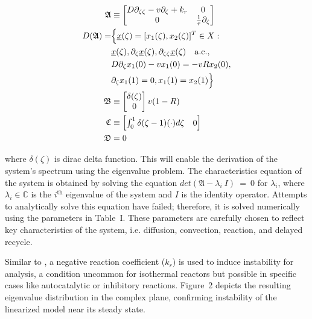 \begin{equation} \label{eq:operator_A}
    \begin{aligned}
        \mathfrak{A} &\equiv
        \begin{bmatrix}
            D \partial_{\zeta \zeta} - v \partial_\zeta + k_r & 0 \\
            0 & \frac{1}{\tau} \partial_\zeta
        \end{bmatrix} \\
        D(\mathfrak{A}) =& \Bigl\{ \underline{x}(\zeta) = [x_1(\zeta), x_2(\zeta)]^T \in X:\\
        &\underline{x}(\zeta), \partial_\zeta \underline{x}(\zeta), \partial_{\zeta \zeta} \underline{x}(\zeta) \quad \mathrm{a.c.},\\
        &D \partial_\zeta x_1(0) - v x_1(0) = -v R x_2(0),\\
        &\partial_\zeta x_1(1) = 0,
        x_1(1) = x_2(1) \Bigr\}\\
        \mathfrak{B} &\equiv
        \begin{bmatrix}
            \delta(\zeta) \\
            0
        \end{bmatrix} v(1-R) \\
        \mathfrak{C} &\equiv
        \begin{bmatrix}
            \int_0^1 \delta(\zeta-1) (\cdot) d\zeta & 0
        \end{bmatrix} \\
        \mathfrak{D} &= 0
    \end{aligned}
\end{equation}

where $\delta(\zeta)$ is dirac delta function. This will enable the derivation of the system's spectrum using the eigenvalue problem. The characteristics equation of the system is obtained by solving the equation $det(\mathfrak{A}-\lambda_i~I)~=~0$ for $\lambda_i$, where $\lambda_i \in \mathbb{C}$ is the $i^{\text{th}}$ eigenvalue of the system and $I$ is the identity operator. Attempts to analytically solve this equation have failed; therefore, it is solved numerically using the parameters in Table~I. These parameters are carefully chosen to reflect key characteristics of the system, i.e. diffusion, convection, reaction, and delayed recycle. 

Similar to \cite{moadeli2025optimal}, a negative reaction coefficient ($k_r$) is used to induce instability for analysis, a condition uncommon for isothermal reactors but possible in specific cases like autocatalytic or inhibitory reactions. Figure~2 depicts the resulting eigenvalue distribution in the complex plane, confirming instability of the linearized model near its steady state.



